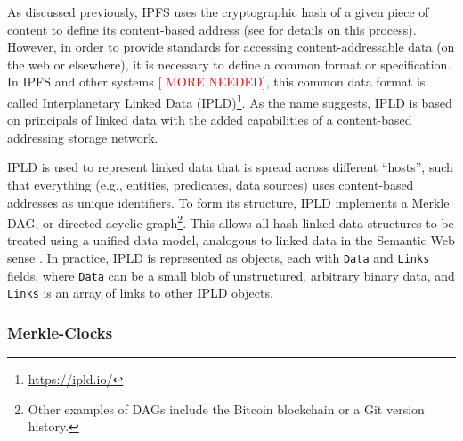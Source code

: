 \documentclass{textile}
\begin{document}
As discussed previously, IPFS uses the cryptographic hash of a given piece of content to define its content-based address (see \cite{benetIPFSContentAddressed2014} for details on this process). However, in order to provide standards for accessing content-addressable data (on the web or elsewhere), it is necessary to define a common format or specification. In IPFS and other systems [\cite[e.g.,][]{protocollabsFilecoinDecentralizedStorage2017} \textcolor{red}{MORE NEEDED}], this common data format is called Interplanetary Linked Data (IPLD)\footnote{\url{https://ipld.io/}}. As the name suggests, IPLD is based on principals of linked data \cite{berners-leeLinkedData2009,bizerLinkedDataStory2011} with the added capabilities of a content-based addressing storage network. 

IPLD is used to represent linked data that is spread across different ``hosts'', such that everything (e.g., entities, predicates, data sources) \cite{heathLinkedDataEvolving2011} uses content-based addresses as unique identifiers. To form its structure, IPLD implements a Merkle DAG, or directed acyclic graph\footnote{Other examples of DAGs include the Bitcoin blockchain or a Git version history.}. This allows all hash-linked data structures to be treated using a unified data model, analogous to linked data in the Semantic Web sense \cite{brendanobrienDeterministicQueryingDistributed2017}. In practice, IPLD is represented as objects, each with \texttt{Data} and \texttt{Links} fields, where \texttt{Data} can be a small blob of unstructured, arbitrary binary data, and \texttt{Links} is an array of links to other IPLD objects. 

\subsubsection{Merkle-Clocks} \label{sec:merkleclocks}
\end{document}

